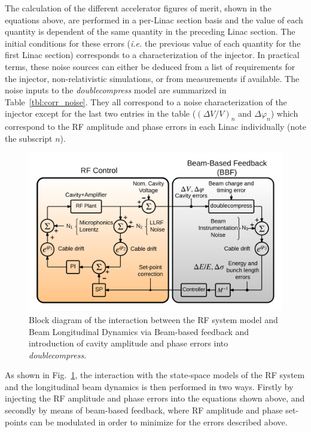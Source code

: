 \documentclass[a4paper,12pt]{article}
\begin{document}
The calculation of the different accelerator figures of merit, shown in the equations above, are performed in a per-Linac section basis and the value of each quantity is dependent of the same quantity in the preceding Linac section. The initial conditions for these errors (\emph{i.e.} the previous value of each quantity for the first Linac section) corresponds to a characterization of the injector. In practical terms, these noise sources can either be deduced from a list of requirements for the injector, non-relativistic simulations, or from measurements if available. The noise inputs to the \emph{doublecompress} model are summarized in Table~\ref{tbl:corr_noise}. They all correspond to a noise characterization of the injector except for the last two entries in the table ($\left(\Delta V/V\right)_n$ and $\Delta \varphi_n$) which correspond to the RF amplitude and phase errors in each Linac individually (note the subscript $n$).

\begin{figure}
\centering
\includegraphics[scale=0.75]{../figures/rf_dc_block_diagram.png}
\caption{Block diagram of the interaction between the RF system model and Beam Longitudinal Dynamics via Beam-based feedback and introduction of cavity amplitude and phase errors into \emph{doublecompress}.}
\label{fig:RF_DC_block_diagram}
\end{figure}

As shown in Fig.~\ref{fig:RF_DC_block_diagram}, the interaction with the state-space models of the RF system and the longitudinal beam dynamics is then performed in two ways. Firstly by injecting the RF amplitude and phase errors into the equations shown above, and secondly by means of beam-based feedback, where RF amplitude and phase set-points can be modulated in order to minimize for the errors described above.
\end{document}
